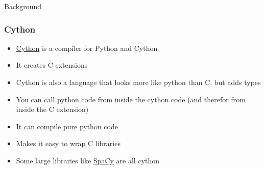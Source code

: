 \documentclass{beamer}
\theoremstyle{case}
\begin{document}
\begin{section}{Background}
\begin{frame}
    \frametitle{Cython}
    \begin{itemize}
        \item<1-> \href{https://cython.org/}{Cython} is a compiler for Python and Cython
        \item<2-> It creates C extensions
        \item<3-> Cython is also a language that looks more like python than C, but adds types
        \item<4-> You can call python code from inside the cython code (and therefor from inside the C extension)
        \item<5-> It can compile pure python code
        \item<6-> Makes it easy to wrap C libraries
        \item<7-> Some large libraries like \href{https://spacy.io/}{SpaCy} are all cython
    \end{itemize}
\end{frame}

\end{section} %
\end{document}
